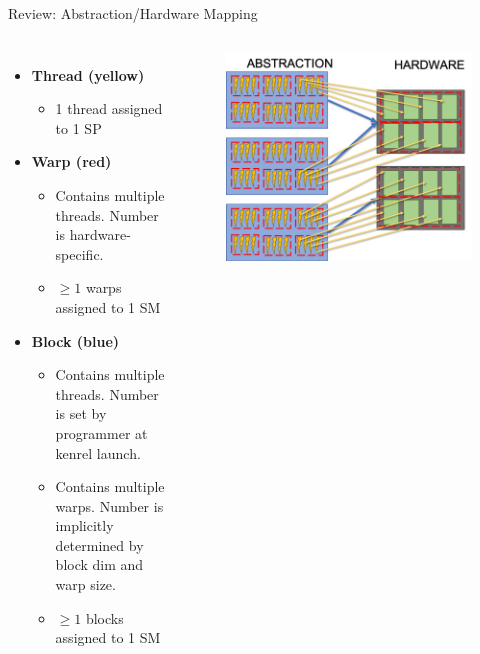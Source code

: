 \documentclass{beamer}
\begin{document}
    \begin{frame}{Review: Abstraction/Hardware Mapping}
        \begin{columns}
            {\footnotesize
            \begin{itemize}
                \item \textbf{Thread (yellow)}
                \begin{itemize}
                    \item 1 thread assigned to 1 SP
                \end{itemize}
                \item \textbf{Warp (red)}
                \begin{itemize}
                    \item Contains multiple threads.  Number is hardware-specific.
                    \item $\ge 1$ warps assigned to 1 SM
                \end{itemize}
                \item \textbf{Block (blue)}
                \begin{itemize}
                    \item Contains multiple threads. Number is set by programmer at kenrel launch.
                    \item Contains multiple warps.  Number is implicitly determined by block dim and warp size.
                    \item $\ge 1$ blocks assigned to 1 SM
                \end{itemize}
            \end{itemize}
            }
            \begin{figure}
                \centering
                \includegraphics[width=\textwidth]{img/03/gpu-hard-abs.png}
            \end{figure}
        \end{columns}
    \end{frame}
\end{document}
